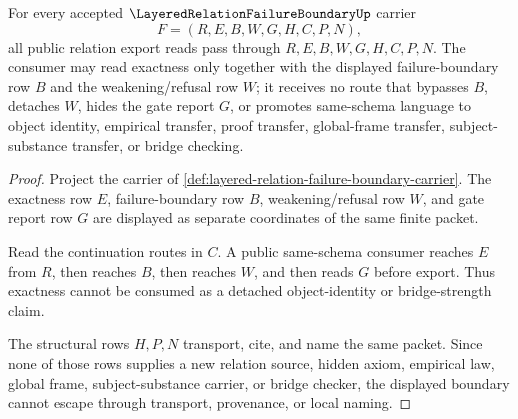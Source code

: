 \begin{theorem}
\label{thm:layered-relation-failure-boundary-nonescape}
For every accepted $\LayeredRelationFailureBoundaryUp$ carrier
$$
F=(R,E,B,W,G,H,C,P,N),
$$
all public relation export reads pass through $R,E,B,W,G,H,C,P,N$. The consumer may read exactness only together with the displayed failure-boundary row $B$ and the weakening/refusal row $W$; it receives no route that bypasses $B$, detaches $W$, hides the gate report $G$, or promotes same-schema language to object identity, empirical transfer, proof transfer, global-frame transfer, subject-substance transfer, or bridge checking.
\end{theorem}
\begin{proof}
Project the carrier of \autoref{def:layered-relation-failure-boundary-carrier}. The exactness row $E$, failure-boundary row $B$, weakening/refusal row $W$, and gate report row $G$ are displayed as separate coordinates of the same finite packet.

Read the continuation routes in $C$. A public same-schema consumer reaches $E$ from $R$, then reaches $B$, then reaches $W$, and then reads $G$ before export. Thus exactness cannot be consumed as a detached object-identity or bridge-strength claim.

The structural rows $H,P,N$ transport, cite, and name the same packet. Since none of those rows supplies a new relation source, hidden axiom, empirical law, global frame, subject-substance carrier, or bridge checker, the displayed boundary cannot escape through transport, provenance, or local naming.
\end{proof}

